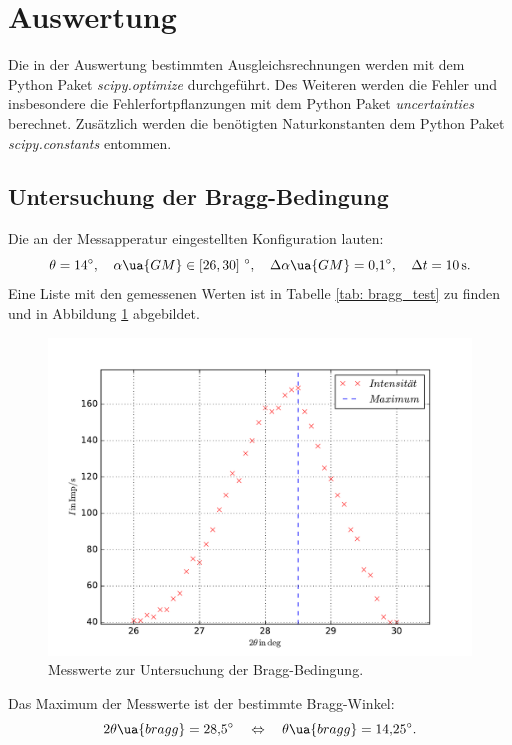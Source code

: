 \section{Auswertung}
Die in der Auswertung bestimmten Ausgleichsrechnungen werden mit
dem Python Paket \emph{scipy.optimize}\cite{scipy} durchgeführt.
Des Weiteren werden die Fehler und insbesondere die Fehlerfortpflanzungen
mit dem Python Paket \emph{uncertainties}\cite{uncertainties} berechnet.
Zusätzlich werden die benötigten Naturkonstanten dem Python Paket \emph{scipy.constants}\cite{scipy.constants}
entommen.

\subsection{Untersuchung der Bragg-Bedingung}
Die an der Messapperatur eingestellten Konfiguration lauten:
\begin{equation*}
  \theta=\SI{14}{\degree}, \quad \alpha\ua{GM}\in\left[26,30\right]\,\si{\degree},\quad \Delta\alpha\ua{GM}=\SI{0.1}{\degree}, \quad \Delta t=\SI{10}{\second}.
\end{equation*}
Eine Liste mit den gemessenen Werten ist in Tabelle \ref{tab: bragg_test} zu finden und in Abbildung \ref{fig: bragg_plot} abgebildet.

\begin{figure}
  \centering
  \includegraphics[width=0.8 \textwidth]{../Messdaten/bragbed.pdf}
  \caption{Messwerte zur Untersuchung der Bragg-Bedingung.} %
  \label{fig: bragg_plot}
\end{figure}
Das Maximum der Messwerte ist der bestimmte Bragg-Winkel:
\begin{equation}
  \label{eq:bestimmt_bragg_winkel}
  2\theta\ua{bragg}=\SI{28.5}{\degree} \quad \Leftrightarrow \quad \theta\ua{bragg}=\SI{14.25}{\degree}.
\end{equation}


